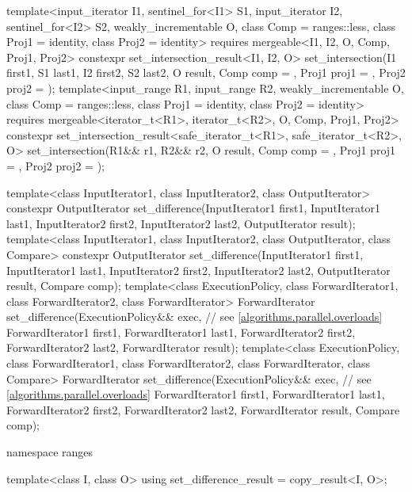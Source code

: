 \begin{codeblock}
{{    template<input_iterator I1, sentinel_for<I1> S1, input_iterator I2, sentinel_for<I2> S2,
             weakly_incrementable O, class Comp = ranges::less,
             class Proj1 = identity, class Proj2 = identity>
      requires mergeable<I1, I2, O, Comp, Proj1, Proj2>
      constexpr set_intersection_result<I1, I2, O>
        set_intersection(I1 first1, S1 last1, I2 first2, S2 last2, O result,
                         Comp comp = {}, Proj1 proj1 = {}, Proj2 proj2 = {});
    template<input_range R1, input_range R2, weakly_incrementable O,
             class Comp = ranges::less, class Proj1 = identity, class Proj2 = identity>
      requires mergeable<iterator_t<R1>, iterator_t<R2>, O, Comp, Proj1, Proj2>
      constexpr set_intersection_result<safe_iterator_t<R1>, safe_iterator_t<R2>, O>
        set_intersection(R1&& r1, R2&& r2, O result,
                         Comp comp = {}, Proj1 proj1 = {}, Proj2 proj2 = {});
  }

  template<class InputIterator1, class InputIterator2, class OutputIterator>
    constexpr OutputIterator
      set_difference(InputIterator1 first1, InputIterator1 last1,
                     InputIterator2 first2, InputIterator2 last2,
                     OutputIterator result);
  template<class InputIterator1, class InputIterator2, class OutputIterator, class Compare>
    constexpr OutputIterator
      set_difference(InputIterator1 first1, InputIterator1 last1,
                     InputIterator2 first2, InputIterator2 last2,
                     OutputIterator result, Compare comp);
  template<class ExecutionPolicy, class ForwardIterator1, class ForwardIterator2,
           class ForwardIterator>
    ForwardIterator
      set_difference(ExecutionPolicy&& exec,                    // see \ref{algorithms.parallel.overloads}
                     ForwardIterator1 first1, ForwardIterator1 last1,
                     ForwardIterator2 first2, ForwardIterator2 last2,
                     ForwardIterator result);
  template<class ExecutionPolicy, class ForwardIterator1, class ForwardIterator2,
           class ForwardIterator, class Compare>
    ForwardIterator
      set_difference(ExecutionPolicy&& exec,                    // see \ref{algorithms.parallel.overloads}
                     ForwardIterator1 first1, ForwardIterator1 last1,
                     ForwardIterator2 first2, ForwardIterator2 last2,
                     ForwardIterator result, Compare comp);

  namespace ranges {
    template<class I, class O>
    using set_difference_result = copy_result<I, O>;

}}
\end{codeblock}
